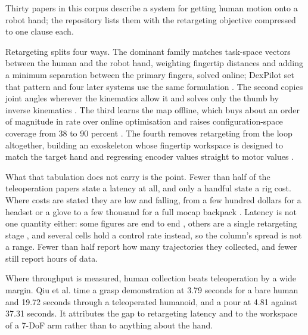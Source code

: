 \label{sec:train:human:teleop}
Thirty papers in this corpus describe a system for getting human motion onto a robot hand; the repository
lists them with the retargeting objective compressed to one clause each.


Retargeting splits four ways. The dominant family matches task-space vectors between the human
and the robot hand, weighting fingertip distances and adding a minimum separation between the
primary fingers, solved online; DexPilot \cite{dexpilot_2020} set that pattern and four later
systems use the same formulation
\cite{anyteleop_2023,open_television_2024,bunny_visionpro_2024,ace_teleop_2024}. The second copies
joint angles wherever the kinematics allow it and solves only the thumb by inverse kinematics
\cite{holo_dex_2022}. The third learns the map offline, which buys about an order of magnitude in
rate over online optimisation and raises configuration-space coverage from 38 to 90 percent
\cite{geometric_retargeting_2025}. The fourth removes retargeting from the loop altogether,
building an exoskeleton whose fingertip workspace is designed to match the target hand and
regressing encoder values straight to motor values \cite{dexumi_2025}.

What that tabulation does not carry is the point. Fewer than half of the teleoperation papers
state a latency at all, and only a handful state a rig cost. Where costs are stated they are low
and falling, from a few hundred dollars for a headset or a glove \cite{holo_dex_2022,doglove_2025}
to a few thousand for a full mocap backpack \cite{dexcap_2024,bidex_teleop_2024}. Latency is not
one quantity either: some figures are end to end \cite{dexpilot_2020,holo_dex_2022}, others are a
single retargeting stage \cite{geometric_retargeting_2025,anyteleop_2023}, and several cells hold a
control rate instead, so the column's spread is not a range. Fewer than half report how many
trajectories they collected, and fewer still report hours of data.

Where throughput is measured, human collection beats teleoperation by a wide margin. Qiu et al.
\cite{humanoid_policy_human_policy_2025} time a grasp demonstration at 3.79 seconds for a bare
human and 19.72 seconds through a teleoperated humanoid, and a pour at 4.81 against 37.31 seconds.
It attributes the gap to retargeting latency and to the workspace of a 7-DoF arm rather than to
anything about the hand.


